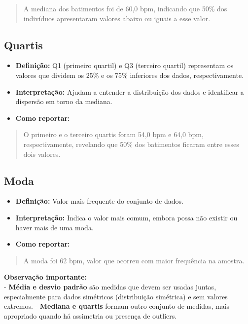 \documentclass[
]{book}
\providecommand{\tightlist}{%
  \setlength{\itemsep}{0pt}\setlength{\parskip}{0pt}}
\begin{document}
\begin{quote}
A mediana dos batimentos foi de 60,0 bpm, indicando que 50\% dos indivíduos apresentaram valores abaixo ou iguais a esse valor.
\end{quote}

\subsection{Quartis}\label{quartis}

\begin{itemize}
\tightlist
\item
  \textbf{Definição:} Q1 (primeiro quartil) e Q3 (terceiro quartil) representam os valores que dividem os 25\% e os 75\% inferiores dos dados, respectivamente.\\
\item
  \textbf{Interpretação:} Ajudam a entender a distribuição dos dados e identificar a dispersão em torno da mediana.\\
\item
  \textbf{Como reportar:}
\end{itemize}

\begin{quote}
O primeiro e o terceiro quartis foram 54,0 bpm e 64,0 bpm, respectivamente, revelando que 50\% dos batimentos ficaram entre esses dois valores.
\end{quote}

\subsection{Moda}\label{moda}

\begin{itemize}
\tightlist
\item
  \textbf{Definição:} Valor mais frequente do conjunto de dados.\\
\item
  \textbf{Interpretação:} Indica o valor mais comum, embora possa não existir ou haver mais de uma moda.\\
\item
  \textbf{Como reportar:}
\end{itemize}

\begin{quote}
A moda foi 62 bpm, valor que ocorreu com maior frequência na amostra.
\end{quote}

\textbf{Observação importante:}\\
- \textbf{Média e desvio padrão} são medidas que devem ser usadas juntas, especialmente para dados simétricos (distribuição simétrica) e sem valores extremos.
- \textbf{Mediana e quartis} formam outro conjunto de medidas, mais apropriado quando há assimetria ou presença de outliers.
\end{document}
